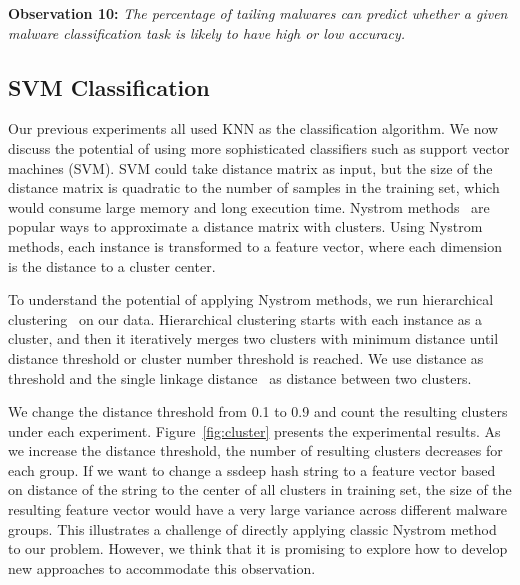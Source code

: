 {\bf Observation 10:} 
{\em The percentage of tailing malwares
can predict whether a given malware classification task is likely to have high or low accuracy.}



\subsection{SVM Classification}
Our previous experiments all used KNN as the classification algorithm.
We now discuss the potential of using
more sophisticated classifiers such as
support vector machines (SVM). 
SVM could take distance matrix as input,
but the size of the distance matrix is quadratic to the number of samples in the training set, 
which would consume large memory and long execution time.
Nystrom methods~\cite{clustering-purpose} are popular ways to
approximate a distance matrix with clusters.
Using Nystrom methods, each instance is transformed to a feature vector, where each dimension is the distance to a cluster center. 

To understand the potential of applying Nystrom methods, we run hierarchical clustering~\cite{hcluster} on our data.
Hierarchical clustering starts with each instance as a cluster, 
and then it iteratively merges two clusters with minimum distance 
until distance threshold or cluster number threshold is reached. 
We use distance as threshold and the single linkage distance~\cite{single-link} as distance between two clusters. 

We change the distance threshold from 0.1 to 0.9
and count the resulting clusters under each experiment. 
Figure~\ref{fig:cluster} presents the experimental results.
As we increase the distance threshold, the number of resulting clusters decreases for each group. 
If we want to change a ssdeep hash string to a feature vector
based on distance of the string to the center of all clusters in training set, 
the size of the resulting feature vector would have a very large variance across different malware groups. 
This illustrates a challenge of directly applying
classic Nystrom method to our problem. 
However, we think that it is promising to explore how to develop new approaches to
accommodate this observation.


